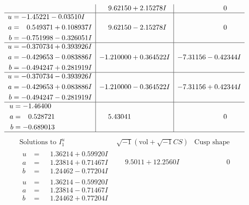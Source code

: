 \documentclass[1p]{elsarticle_modified}
\theoremstyle{definition}
\newcommand{\I}{\sqrt{-1}}
\begin{document}
$$\begin{array}{c|c|c}
 & \phantom{-}9.62150 + 2.15278 I & \phantom{-0.000000 } 0 \\ \hline\begin{aligned}
u &= -1.45221 - 0.03510 I \\
a &= \phantom{-}0.549371 + 0.108937 I \\
b &= -0.751998 - 0.326051 I\end{aligned}
 & \phantom{-}9.62150 - 2.15278 I & \phantom{-0.000000 } 0 \\ \hline\begin{aligned}
u &= -0.370734 + 0.393926 I \\
a &= -0.429653 - 0.083886 I \\
b &= -0.494247 + 0.281919 I\end{aligned}
 & -1.210000 + 0.364522 I & -7.31156 - 0.42344 I \\ \hline\begin{aligned}
u &= -0.370734 - 0.393926 I \\
a &= -0.429653 + 0.083886 I \\
b &= -0.494247 - 0.281919 I\end{aligned}
 & -1.210000 - 0.364522 I & -7.31156 + 0.42344 I \\ \hline\begin{aligned}
u &= -1.46400\phantom{ +0.000000I} \\
a &= \phantom{-}0.528721\phantom{ +0.000000I} \\
b &= -0.689013\phantom{ +0.000000I}\end{aligned}
 & \phantom{-}5.43041\phantom{ +0.000000I} & \phantom{-0.000000 } 0\\
 \hline 
 \end{array}$$\newpage$$\begin{array}{c|c|c}  
\text{Solutions to }I^u_{1}& \I (\text{vol} + \sqrt{-1}CS) & \text{Cusp shape}\\
 \hline 
\begin{aligned}
u &= \phantom{-}1.36214 + 0.59920 I \\
a &= \phantom{-}1.23814 + 0.71467 I \\
b &= \phantom{-}1.24462 - 0.77204 I\end{aligned}
 & \phantom{-}9.5011 + 12.2560 I & \phantom{-0.000000 } 0 \\ \hline\begin{aligned}
u &= \phantom{-}1.36214 - 0.59920 I \\
a &= \phantom{-}1.23814 - 0.71467 I \\
b &= \phantom{-}1.24462 + 0.77204 I\end{aligned}

\end{array}$$
\end{document}
